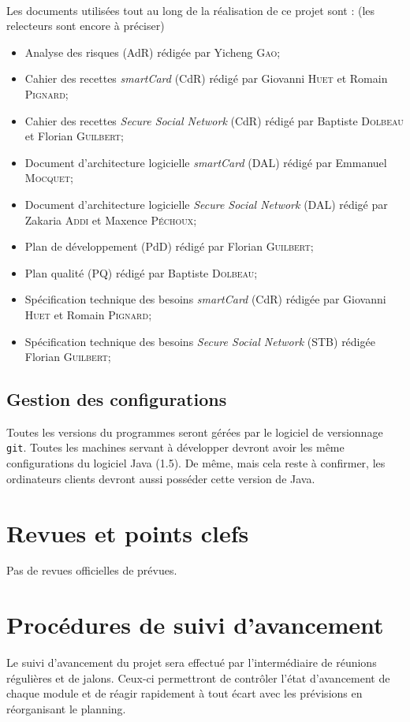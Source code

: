\documentclass[a4paper,11pt,french]{article}
\begin{document}
\paragraph{}
Les documents utilisées tout au long de la réalisation de ce projet sont : 
(les relecteurs sont encore à préciser)
\begin{itemize}
 \item Analyse des risques (AdR) rédigée par Yicheng \textsc{Gao};
 \item Cahier des recettes \emph{smartCard} (CdR) rédigé par Giovanni 
\textsc{Huet} et Romain \textsc{Pignard};
 \item Cahier des recettes \emph{Secure Social Network} (CdR) rédigé par 
 Baptiste \textsc{Dolbeau} et Florian \textsc{Guilbert};
 \item Document d'architecture logicielle \emph{smartCard} (DAL) rédigé par 
 Emmanuel \textsc{Mocquet};
 \item Document d'architecture logicielle \emph{Secure Social Network} (DAL) 
 rédigé par Zakaria \textsc{Addi} et Maxence \textsc{Péchoux};
 \item Plan de développement (PdD) rédigé par Florian \textsc{Guilbert};
 \item Plan qualité (PQ) rédigé par Baptiste \textsc{Dolbeau};
 \item Spécification technique des besoins \emph{smartCard} (CdR) rédigée par 
 Giovanni \textsc{Huet} et Romain \textsc{Pignard};
 \item Spécification technique des besoins \emph{Secure Social Network} (STB) 
    rédigée Florian \textsc{Guilbert};
\end{itemize}

\subsection{Gestion des configurations}
Toutes les versions du programmes seront gérées par le logiciel de versionnage 
\texttt{git}. Toutes les machines servant à développer devront
avoir les même configurations du logiciel Java (1.5). De même, mais cela reste
à confirmer, les ordinateurs clients devront aussi posséder cette version de
Java.

\section{Revues et points clefs}
Pas de revues officielles de prévues.

\section{Procédures de suivi d'avancement}
Le suivi d'avancement du projet sera effectué par l'intermédiaire de réunions
régulières et de jalons. Ceux-ci permettront de contrôler l'état d'avancement
de chaque module et de réagir rapidement à tout écart avec les prévisions en
réorganisant le planning.
\end{document}
